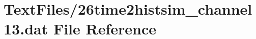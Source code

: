 \hypertarget{26time2histsim__channel13_8dat}{}\section{Text\+Files/26time2histsim\+\_\+channel13.dat File Reference}
\label{26time2histsim__channel13_8dat}
